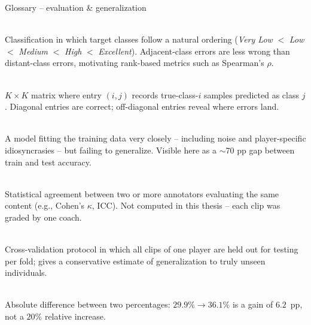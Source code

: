 \begin{frame}{Glossary -- evaluation \& generalization}
\footnotesize
\begin{description}\setlength{\itemsep}{7pt}\setlength{\parsep}{0pt}
\item[\textbf{Ordinal classification}]\hfill\\
Classification in which target classes follow a natural ordering (\textit{Very Low} $<$ \textit{Low} $<$ \textit{Medium} $<$ \textit{High} $<$ \textit{Excellent}). Adjacent-class errors are less wrong than distant-class errors, motivating rank-based metrics such as Spearman's $\rho$.

\item[\textbf{Confusion matrix}]\hfill\\
$K\!\times\!K$ matrix where entry $(i, j)$ records true-class-$i$ samples predicted as class $j$. Diagonal entries are correct; off-diagonal entries reveal where errors land.

\item[\textbf{Overfitting}]\hfill\\
A model fitting the training data very closely -- including noise and player-specific idiosyncrasies -- but failing to generalize. Visible here as a $\sim$70 pp gap between train and test accuracy.

\item[\textbf{Inter-rater reliability}]\hfill\\
Statistical agreement between two or more annotators evaluating the same content (e.g., Cohen's $\kappa$, ICC). Not computed in this thesis -- each clip was graded by one coach.

\item[\textbf{Leave-one-player-out} (LOPO)]\hfill\\
Cross-validation protocol in which all clips of one player are held out for testing per fold; gives a conservative estimate of generalization to truly unseen individuals.

\item[\textbf{Percentage points} (pp)]\hfill\\
Absolute difference between two percentages: $29.9\%\!\to\!36.1\%$ is a gain of $6.2$~pp, not a $20\%$ relative increase.
\end{description}
\end{frame}

